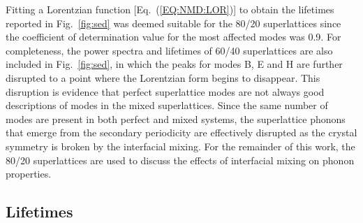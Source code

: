 \documentclass[aps,prb,preprint,preprintnumbers,amsmath,amssymb,floatfix,superscriptaddress]{revtex4}
\begin{document}
Fitting a Lorentzian function [Eq.~(\ref{EQ:NMD:LOR})] to obtain the lifetimes reported in Fig.~\ref{fig:sed} was deemed suitable for the 80/20 superlattices since the coefficient of determination value \cite{Cowpe20081066} for the most affected modes was 0.9. For completeness, the power spectra and lifetimes of 60/40 superlattices are also included in Fig.~\ref{fig:sed}, in which the peaks for modes B, E and H are further disrupted to a point where the Lorentzian form begins to disappear. This disruption is evidence that perfect superlattice modes are not always good descriptions of modes in the mixed superlattices. Since the same number of modes are present in both perfect and mixed systems, the superlattice phonons that emerge from the secondary periodicity are effectively disrupted as the crystal symmetry is broken by the interfacial mixing. For the remainder of this work, the 80/20 superlattices are used to discuss the effects of interfacial mixing on phonon properties.
\renewcommand{\topfraction}{1.0}
\begin{figure*}%
\begin{center}
\renewcommand{\figure}{Fig.}
\caption{Power spectra for selected modes of the $4\times 4$ perfect and mixed superlattices [indicated by the labeled gray square markers in Figs.~\ref{fig:dispersion}(a)-\ref{fig:dispersion}(c)]. Dark blue corresponds to a perfect superlattice, red corresponds to mixing of 80/20, and light blue corresponds to mixing of 60/40. Reported lifetimes calculated from the fitting of the Lorentzian functions (not shown) are also included. By removing a single MD seed, the average uncertainty in the fitting was determined to be 7.5\%.}
\label{fig:sed}
\end{center}
\end{figure*}

\subsection{Lifetimes}
\end{document}
